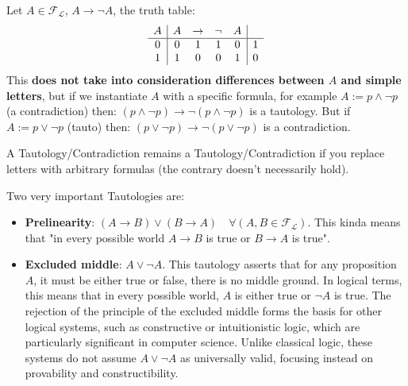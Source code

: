 	Let $A \in \mathcal{F}_\mathcal{L}$, $A \rightarrow \neg A$, the truth table:
	$$
	\begin{array}{c | c c c c | c}
		A & A & \rightarrow & \neg & A & \\
		\hline
		0 & 0 & 1 & 1 & 0 & 1\\
		1 & 1 & 0 & 0 & 1 & 0\\
	\end{array}
	$$
	This \textbf{does not take into consideration differences between $A$ and simple letters}, but if we instantiate $A$ with a specific formula, for example $A := p \wedge \neg p$ (a contradiction) then: $(p \wedge \neg p) \rightarrow \neg (p \wedge \neg p) $ is a tautology. But if $A:= p \vee \neg p$ (tauto) then:
	$ (p \vee \neg p) \rightarrow \neg (p \vee \neg p)$
	is a contradiction.

	\begin{fact}
	A Tautology/Contradiction remains a Tautology/Contradiction if you replace letters with arbitrary formulas (the contrary doesn't necessarily hold).
	\end{fact}

	\noindent
	Two very important Tautologies are:
	\indent

	\begin{itemize}
	\item \textbf{Prelinearity}: $(A \rightarrow B) \vee (B \rightarrow A) \quad  \forall (A, B \in \mathcal{F}_\mathcal{L})$. This kinda means that "in every possible world $A \rightarrow B$ is true or $B \rightarrow A$ is true". \smallvspace

	  \item \textbf{Excluded middle}: \( A \vee \neg A \). This tautology asserts that for any proposition \( A \), it must be either true or false, there is no middle ground. In logical terms, this means that in every possible world, \( A \) is either true or \( \neg A \) is true. The rejection of the principle of the excluded middle forms the basis for other logical systems, such as constructive or intuitionistic logic, which are particularly significant in computer science. Unlike classical logic, these systems do not assume \( A \vee \neg A \) as universally valid, focusing instead on provability and constructibility.

	\end{itemize}

	\newpage


